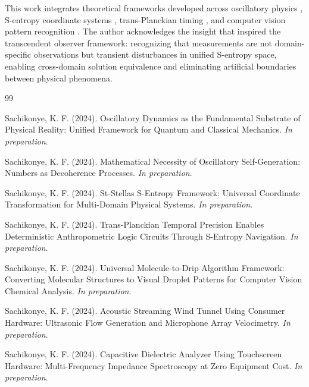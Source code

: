 \documentclass[12pt,a4paper]{article}
\begin{document}
{{{{{{{{{{{{{{{{{\begin{algorithm}
{{{{{{{{{This work integrates theoretical frameworks developed across oscillatory physics \cite{sachikonye2024physical_necessity, sachikonye2024mathematical_necessity}, S-entropy coordinate systems \cite{sachikonye2024st_stellas}, trans-Planckian timing \cite{sachikonye2024transplanckian}, and computer vision pattern recognition \cite{sachikonye2024molecule_to_drip}. The author acknowledges the insight that inspired the transcendent observer framework: recognizing that measurements are not domain-specific observations but transient disturbances in unified S-entropy space, enabling cross-domain solution equivalence and eliminating artificial boundaries between physical phenomena.


\begin{thebibliography}{99}

Sachikonye, K. F. (2024). Oscillatory Dynamics as the Fundamental Substrate of Physical Reality: Unified Framework for Quantum and Classical Mechanics. \textit{In preparation}.

Sachikonye, K. F. (2024). Mathematical Necessity of Oscillatory Self-Generation: Numbers as Decoherence Processes. \textit{In preparation}.

Sachikonye, K. F. (2024). St-Stellas S-Entropy Framework: Universal Coordinate Transformation for Multi-Domain Physical Systems. \textit{In preparation}.

Sachikonye, K. F. (2024). Trans-Planckian Temporal Precision Enables Deterministic Anthropometric Logic Circuits Through S-Entropy Navigation. \textit{In preparation}.

Sachikonye, K. F. (2024). Universal Molecule-to-Drip Algorithm Framework: Converting Molecular Structures to Visual Droplet Patterns for Computer Vision Chemical Analysis. \textit{In preparation}.

Sachikonye, K. F. (2024). Acoustic Streaming Wind Tunnel Using Consumer Hardware: Ultrasonic Flow Generation and Microphone Array Velocimetry. \textit{In preparation}.

Sachikonye, K. F. (2024). Capacitive Dielectric Analyzer Using Touchscreen Hardware: Multi-Frequency Impedance Spectroscopy at Zero Equipment Cost. \textit{In preparation}.


\end{thebibliography}}}}}}}}}}
\end{algorithm}}}}}}}}}}}}}}}}}}
\end{document}
